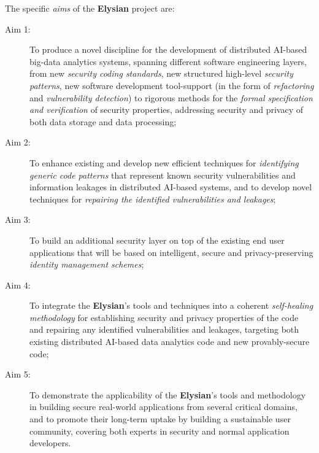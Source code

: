 \documentclass[a4paper,11pt]{article}
\newcommand{\project}[1]{\textbf{#1}\xspace}
\newcommand{\SECURITY}{\project{Elysian}}
\newcommand{\TheProject}{\SECURITY}
\begin{document}


The specific \emph{aims} of the \TheProject{} project are:

\begin{description}
\item[Aim 1:] To produce a novel discipline for the development of distributed AI-based big-data analytics systems, spanning different software engineering layers, from new \emph{security coding standards}, new structured high-level \emph{security patterns}, new software development tool-support (in the form of \emph{refactoring} and \emph{vulnerability detection}) to rigorous methods for the \emph{formal specification and verification} of security properties, addressing security and privacy of both data storage and data processing;

\item[Aim 2:] To %
enhance existing and develop new efficient techniques for \emph{identifying generic code patterns} that
  represent known security vulnerabilities and information leakages in distributed AI-based systems, and to develop novel techniques for  
  \emph{repairing the identified vulnerabilities and leakages};

\item[Aim 3:] To build an additional security layer on top of the existing end user applications that will be based on intelligent, secure and privacy-preserving \emph{identity management schemes};

\item[Aim 4:] To integrate the \TheProject{}'s tools and techniques into a coherent \emph{self-healing methodology} for establishing
  security and privacy properties of the code and repairing any identified vulnerabilities and leakages, targeting both 
  existing distributed AI-based data analytics code and new provably-secure code;

\item[Aim 5:]  To demonstrate the applicability of the \TheProject{}'s tools and
 methodology in building secure real-world applications from 
 several critical %
 domains, and to promote their long-term uptake by building a sustainable user community,
 covering both experts in security and normal application developers.

\end{description}
\end{document}
